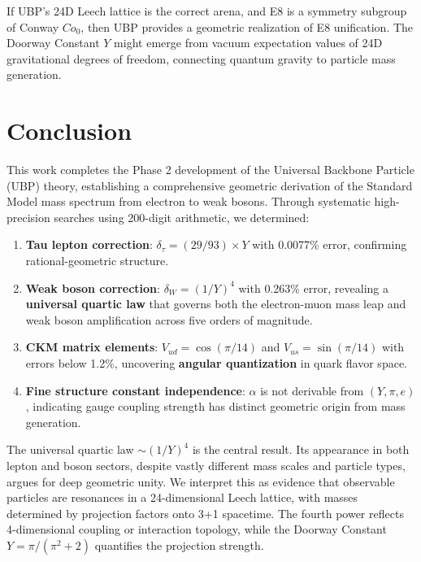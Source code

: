 \documentclass[11pt,a4paper]{article}
\begin{document}
If UBP's 24D Leech lattice is the correct arena, and E8 is a symmetry subgroup of Conway $Co_0$, then UBP provides a geometric realization of E8 unification. The Doorway Constant $Y$ might emerge from vacuum expectation values of 24D gravitational degrees of freedom, connecting quantum gravity to particle mass generation.

\section{Conclusion}

This work completes the Phase 2 development of the Universal Backbone Particle (UBP) theory, establishing a comprehensive geometric derivation of the Standard Model mass spectrum from electron to weak bosons. Through systematic high-precision searches using 200-digit arithmetic, we determined:

\begin{enumerate}
\item \textbf{Tau lepton correction}: $\delta_\tau = (29/93) \times Y$ with 0.0077\% error, confirming rational-geometric structure.

\item \textbf{Weak boson correction}: $\delta_W = (1/Y)^4$ with 0.263\% error, revealing a \textbf{universal quartic law} that governs both the electron-muon mass leap and weak boson amplification across five orders of magnitude.

\item \textbf{CKM matrix elements}: $V_{ud} = \cos(\pi/14)$ and $V_{us} = \sin(\pi/14)$ with errors below 1.2\%, uncovering \textbf{angular quantization} in quark flavor space.

\item \textbf{Fine structure constant independence}: $\alpha$ is not derivable from $(Y, \pi, e)$, indicating gauge coupling strength has distinct geometric origin from mass generation.
\end{enumerate}

The universal quartic law $\sim (1/Y)^4$ is the central result. Its appearance in both lepton and boson sectors, despite vastly different mass scales and particle types, argues for deep geometric unity. We interpret this as evidence that observable particles are resonances in a 24-dimensional Leech lattice, with masses determined by projection factors onto 3+1 spacetime. The fourth power reflects 4-dimensional coupling or interaction topology, while the Doorway Constant $Y = \pi/(\pi^2+2)$ quantifies the projection strength.
\end{document}
